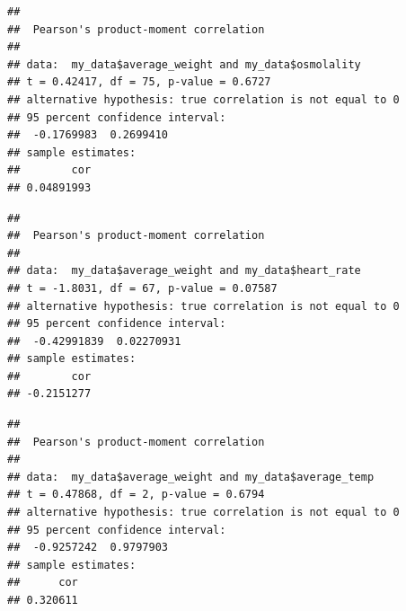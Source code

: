 \documentclass[
]{article}
\newenvironment{Shaded}{\begin{snugshade}}{\end{snugshade}}
\newcommand{\AttributeTok}[1]{\textcolor[rgb]{0.77,0.63,0.00}{#1}}
\newcommand{\FunctionTok}[1]{\textcolor[rgb]{0.00,0.00,0.00}{#1}}
\newcommand{\NormalTok}[1]{#1}
\newcommand{\SpecialCharTok}[1]{\textcolor[rgb]{0.00,0.00,0.00}{#1}}
\newcommand{\StringTok}[1]{\textcolor[rgb]{0.31,0.60,0.02}{#1}}
\begin{document}
\begin{verbatim}
## 
##  Pearson's product-moment correlation
## 
## data:  my_data$average_weight and my_data$osmolality
## t = 0.42417, df = 75, p-value = 0.6727
## alternative hypothesis: true correlation is not equal to 0
## 95 percent confidence interval:
##  -0.1769983  0.2699410
## sample estimates:
##        cor 
## 0.04891993
\end{verbatim}

\begin{Shaded}
\end{Shaded}

\begin{verbatim}
## 
##  Pearson's product-moment correlation
## 
## data:  my_data$average_weight and my_data$heart_rate
## t = -1.8031, df = 67, p-value = 0.07587
## alternative hypothesis: true correlation is not equal to 0
## 95 percent confidence interval:
##  -0.42991839  0.02270931
## sample estimates:
##        cor 
## -0.2151277
\end{verbatim}

\begin{Shaded}
\end{Shaded}

\begin{verbatim}
## 
##  Pearson's product-moment correlation
## 
## data:  my_data$average_weight and my_data$average_temp
## t = 0.47868, df = 2, p-value = 0.6794
## alternative hypothesis: true correlation is not equal to 0
## 95 percent confidence interval:
##  -0.9257242  0.9797903
## sample estimates:
##      cor 
## 0.320611
\end{verbatim}

\begin{Shaded}
\end{Shaded}
\end{document}
